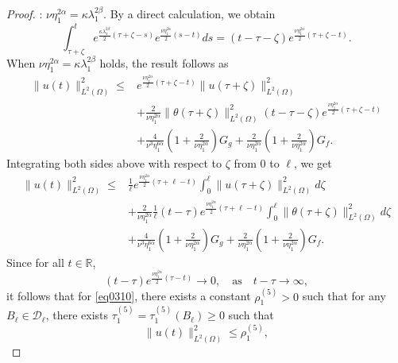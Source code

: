 \documentclass[10pt,a4paper]{amsart}
\begin{document}
\begin{proof}
: $\nu\eta_1^{2\alpha} = \kappa\lambda_1^{2\beta}$. By a direct calculation, we obtain
\[
\int_{\tau+\zeta}^{t} e^{\frac{\kappa\lambda_{1}^{2\beta}}{2}(\tau+\zeta-s)} e^{\frac{\nu\eta_1^{2\alpha}}{2}(s-t)} ds = (t - \tau - \zeta)e^{\frac{\nu\eta_1^{2\alpha}}{2}(\tau+\zeta - t)}.
\]
When \(\nu\eta_1^{2\alpha} = \kappa\lambda_1^{2\beta}\) holds, the result follows as 
\begin{equation}\label{eq0306}
\begin{aligned} 
   \|u(t)\|_{L^2(\Omega)}^2
   \leq 
   & e^{\frac{\nu\eta_1^{2\alpha}}{2}(\tau+\zeta-t)} \|u(\tau+\zeta)\|_{L^2(\Omega)}^2 
   \\
   &
   + \frac{2}{\nu\eta_1^{2\alpha}} \|\theta(\tau+\zeta)\|_{L^2(\Omega)}^2  (t - \tau - \zeta)e^{\frac{\nu\eta_1^{2\alpha}}{2}(\tau+\zeta - t)} \\
   &
   + \frac{4}{\nu^{3}\eta_1^{6\alpha}} 
   \left(1+\frac{2}{\nu\eta_1^{2\alpha}}\right)G_g
   + \frac{2}{\nu\eta_1^{2\alpha}} \left(1+\frac{2}{\nu\eta_1^{2\alpha}}\right)G_f.
\end{aligned}
\end{equation}
Integrating both sides above with respect to $\zeta$ from $0$ to $\ell$, we get
\begin{equation}\label{eq0310}
\begin{aligned} 
   \|u(t)\|_{L^2(\Omega)}^2
   \leq 
   & \frac{1}{\ell} e^{\frac{\nu\eta_1^{2\alpha}}{2}(\tau+\ell-t)}  \int_{0}^{\ell} \|u(\tau+\zeta)\|_{L^2(\Omega)}^2 d\zeta
    \\
   &
   + \frac{2}{\nu\eta_1^{2\alpha}}
   \frac{1}{\ell}(t-\tau)
   e^{\frac{\nu\eta_1^{2\alpha}}{2}(\tau+\ell-t)}
   \int_{0}^{\ell} 
   \|\theta(\tau+\zeta)\|_{L^2(\Omega)}^2  d\zeta \\
   &
   + \frac{4}{\nu^{3}\eta_1^{6\alpha}} 
   \left(1+\frac{2}{\nu\eta_1^{2\alpha}}\right)
   G_g
   + \frac{2}{\nu\eta_1^{2\alpha}} \left(1+\frac{2}{\nu\eta_1^{2\alpha}}\right)G_f.
\end{aligned}
\end{equation}
Since for all $ t \in \mathbb{R} $, 
\[
(t-\tau)e^{\frac{\nu\eta_1^{2\alpha}}{2}(\tau-t)}
\to 0, \quad\text{as}\quad t - \tau \to \infty, 
\]
it follows that for \cref{eq0310}, there exists a constant $\rho_{1}^{(5)} > 0$ such that for any $B_{\ell} \in \mathcal{D}_{\ell}$, there exists $\tau_{1}^{(5)} = \tau_{1}^{(5)}(B_{\ell}) \geq 0$ such that 
\begin{equation}\label{eq0313}
    \|u(t)\|_{L^2(\Omega)}^2 
    \leq 
    \rho_{1}^{(5)},
\end{equation} 

\end{proof}
\end{document}
